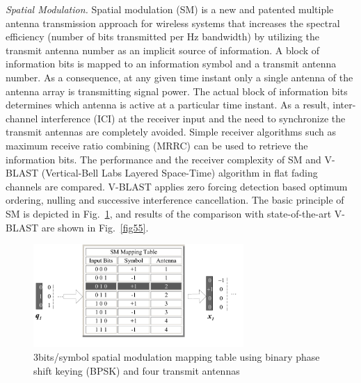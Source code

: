  \emph{Spatial Modulation.} Spatial
modulation (SM) is a new and patented multiple antenna transmission
approach for wireless systems that increases the spectral efficiency
(number of bits transmitted per Hz bandwidth) by utilizing the
transmit antenna number as an implicit source of information. A
block of information bits is mapped to an information symbol and a
transmit antenna number. As a consequence, at any given time instant
only a single antenna of the antenna array is transmitting signal
power. The actual block of information bits determines which antenna
is active at a particular time instant. As a result, inter-channel
interference (ICI) at the receiver input and the need to synchronize
the transmit antennas are completely avoided. Simple receiver
algorithms such as maximum receive ratio combining (MRRC) can be
used to retrieve the information bits. The performance and the
receiver complexity of SM and V-BLAST (Vertical-Bell Labs Layered
Space-Time) algorithm in flat fading channels are compared. V-BLAST
applies zero forcing detection based optimum ordering, nulling and
successive interference cancellation. The basic principle of SM is
depicted in Fig.~\ref{smexmpl}, and results of the comparison with
state-of-the-art V-BLAST are shown in Fig.~\ref{fig55}.
\begin{figure}[!htb]\centering
  \centerline{\includegraphics[width=8cm]{haas_1.pdf}}
  \caption{3bits/symbol spatial modulation mapping table using binary phase shift keying (BPSK)
    and four transmit antennas} \label{smexmpl}
\end{figure}
